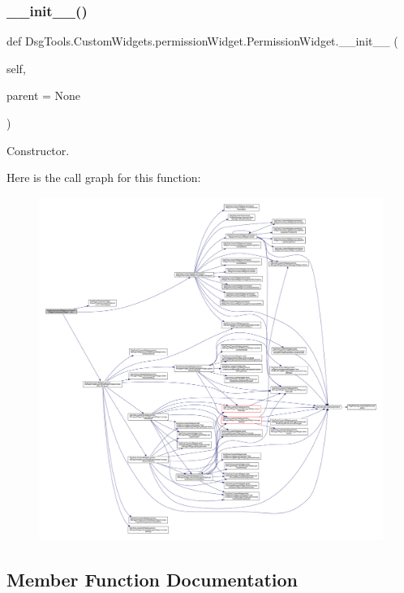 \subsubsection{\texorpdfstring{\+\_\+\+\_\+init\+\_\+\+\_\+()}{\_\_init\_\_()}}
{\footnotesize\ttfamily def Dsg\+Tools.\+Custom\+Widgets.\+permission\+Widget.\+Permission\+Widget.\+\_\+\+\_\+init\+\_\+\+\_\+ (\begin{DoxyParamCaption}\item[{}]{self,  }\item[{}]{parent = {\ttfamily None} }\end{DoxyParamCaption})}

\begin{DoxyVerb}Constructor.\end{DoxyVerb}
 Here is the call graph for this function\+:
\nopagebreak
\begin{figure}[H]
\begin{center}
\leavevmode
\includegraphics[width=350pt]{class_dsg_tools_1_1_custom_widgets_1_1permission_widget_1_1_permission_widget_a7e5dcd7d914261c3aecf7e3969b42796_cgraph}
\end{center}
\end{figure}


\subsection{Member Function Documentation}
\mbox{\label{class_dsg_tools_1_1_custom_widgets_1_1permission_widget_1_1_permission_widget_a7394c765970d6044a57778f790a4fe5e}} 
